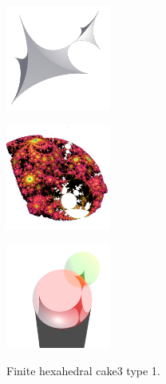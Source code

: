 \documentclass[suppldata, dvipdfmx]{interact}
\theoremstyle{plain}%
\theoremstyle{definition}
\theoremstyle{remark}
\theoremstyle{problemstyle}
\begin{document}
\begin{figure}[h!tbp]
 \begin{minipage}{0.5\textwidth}
  \begin{minipage}[t]{0.24\textwidth}
   \centering \includegraphics[width=1.35in, height=1.35in,
   keepaspectratio]{./img/sphairahedron/hexahedralCake3/sphairahedronFinite_a.jpg}
   \label{fig:cake3finiteSphairahedronType1}
  \end{minipage}
  \hspace*{\fill}
  \begin{minipage}[t]{0.24\textwidth}
   \centering
   \includegraphics[width=1.35in, height=1.35in,
   keepaspectratio]{./img/sphairahedron/hexahedralCake3/limitsetFinite_a.jpg}
   \label{fig:cake3finiteLimitsetType1}
  \end{minipage}
  \hspace*{\fill}
  \caption{Finite hexahedral cake3 type 1.}
  \label{fig:cake3finiteType1}
 \end{minipage}
 \hspace*{\fill}
 \begin{minipage}{0.5\textwidth}
  \begin{minipage}[t]{0.24\textwidth}
   \centering
   \includegraphics[width=1.35in, height=1.35in,
   keepaspectratio]{./img/sphairahedron/hexahedralCake3/sphairahedralPrismInf_a.jpg}
   \label{fig:cake3infiniteSphairahedronType1}

\end{minipage}
\end{minipage}
\end{figure}
\end{document}
